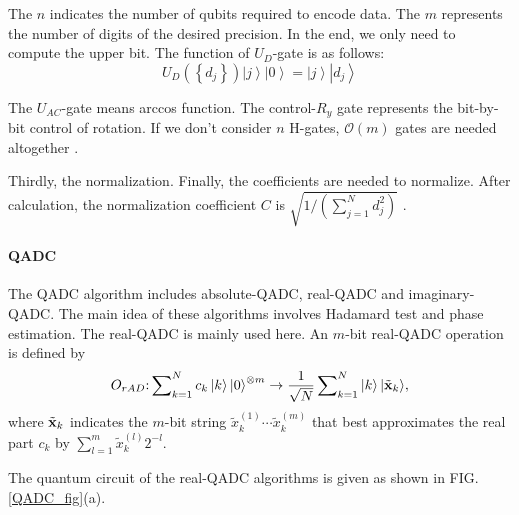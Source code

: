 \documentclass[%
 reprint,
 amsmath,amssymb,
pra,
]{revtex4-1}
\begin{document}
The $n$ indicates the number of qubits required to encode data. The $m$ represents the number of digits of the desired precision. In the end, we only need to compute the upper bit. The function of ${U_D}$-gate is as follows:
\[{U_D}\left( {\left\{ {{d_j}} \right\}} \right)\left| j \right\rangle \left| 0 \right\rangle  = \left| j \right\rangle \left| {{d_j}} \right\rangle \]

The ${U_{AC}}$-gate means arccos function. The control-${R_y}$ gate represents the bit-by-bit control of rotation. If we don't consider $n$ H-gates, $\mathcal{O}(m)$ gates are needed altogether \cite{mitarai2019quantum}.

Thirdly, the normalization. Finally, the coefficients are needed to normalize. After calculation, the normalization coefficient $C$ is $\sqrt {1/\left( {\sum\nolimits_{j = 1}^N {d_j^2} } \right)} $ \cite{mitarai2019quantum}.


\paragraph{QADC}

The QADC algorithm includes absolute-QADC, real-QADC and imaginary-QADC.
The main idea of these algorithms involves Hadamard test and phase estimation. The real-QADC is mainly used here. An $m$-bit real-QADC operation is defined by 
\begin{equation}
{O_{rAD}}{\rm{:}}\sum\nolimits_{k = 1}^N {{c_k}\left| k \right\rangle {{\left| 0 \right\rangle }^{ \otimes m}}}  \to \frac{1}{{\sqrt N }}\sum\nolimits_{k = 1}^N {\left| k \right\rangle \left| {{{\tilde{\textbf x} }_k}} \right\rangle } ,
\end{equation}
where ${\tilde {\textbf x}_k}$ indicates the $m$-bit string $\tilde x_k^{\left( 1 \right)} \cdots \tilde x_k^{\left( m \right)}$ that best approximates the real part ${c_k}$ by $\sum\nolimits_{l = 1}^m {\tilde x_k^{\left( l \right)}{2^{ - l}}} $.

The quantum circuit of the real-QADC algorithms is given as shown in FIG.\ref{QADC_fig}(a).
\end{document}
